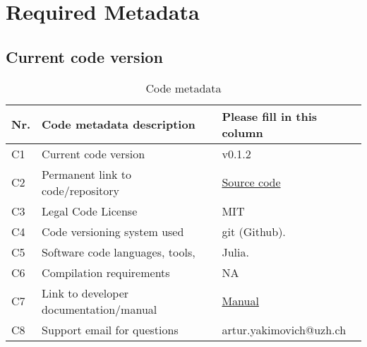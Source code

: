 \section{Required Metadata}

\subsection{Current code version}


\begin{table}
\begin{tabular}{lll}
\hline
\textbf{Nr.} & \textbf{Code metadata description} & \textbf{Please fill in this column} \\
\hline
C1 & Current code version & v0.1.2 \\
\hline
C2 & Permanent link to code/repository & \href{https://github.com/MatlabCompat/MatlabCompat.jl}{Source code} \\
\hline
C3 & Legal Code License   & MIT \\
\hline
C4 & Code versioning system used & git (Github). \\
\hline
C5 & Software code languages, tools, & Julia. \\
\hline
C6 & Compilation requirements & NA \\
\hline
C7 & Link to developer documentation/manual & \href{http://matlabcompat.github.io/help.html}{Manual}\\
\hline
C8 & Support email for questions & artur.yakimovich@uzh.ch\\
\hline
\end{tabular}
\caption{Code metadata}
\end{table}
  
  
  
  
  
  